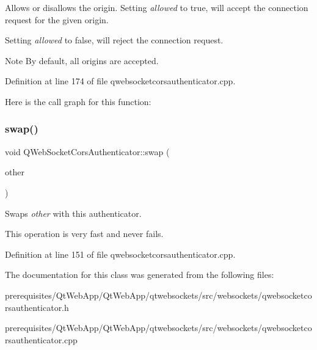 Allows or disallows the origin. Setting {\itshape allowed} to true, will accept the connection request for the given origin.

Setting {\itshape allowed} to false, will reject the connection request.

\begin{DoxyNote}{Note}
By default, all origins are accepted. 
\end{DoxyNote}


Definition at line 174 of file qwebsocketcorsauthenticator.\+cpp.

Here is the call graph for this function\+:
\mbox{\label{class_q_web_socket_cors_authenticator_ad7736d3520ddb2a720bb23dc3333dfac}} 
\subsubsection{\texorpdfstring{swap()}{swap()}}
{\footnotesize\ttfamily void Q\+Web\+Socket\+Cors\+Authenticator\+::swap (\begin{DoxyParamCaption}\item[{\mbox{\hyperlink{class_q_web_socket_cors_authenticator}{Q\+Web\+Socket\+Cors\+Authenticator}} \&}]{other }\end{DoxyParamCaption})}

Swaps {\itshape other} with this authenticator.

This operation is very fast and never fails. 

Definition at line 151 of file qwebsocketcorsauthenticator.\+cpp.



The documentation for this class was generated from the following files\+:\begin{DoxyCompactItemize}
\item 
prerequisites/\+Qt\+Web\+App/\+Qt\+Web\+App/qtwebsockets/src/websockets/qwebsocketcorsauthenticator.\+h\item 
prerequisites/\+Qt\+Web\+App/\+Qt\+Web\+App/qtwebsockets/src/websockets/qwebsocketcorsauthenticator.\+cpp\end{DoxyCompactItemize}
